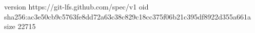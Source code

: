 version https://git-lfs.github.com/spec/v1
oid sha256:ac3e50cb9c5763fe8dd72a63c38c829c18cc375f06b21c395df8922d355a661a
size 22715

